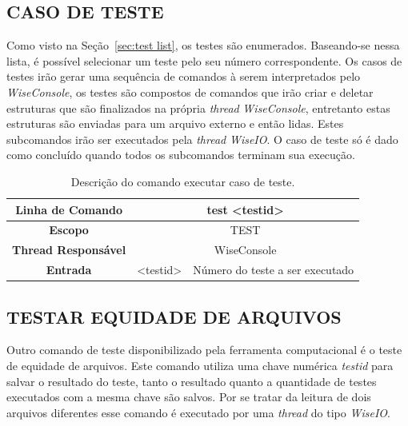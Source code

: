 \subsection{CASO DE TESTE}\label{sec:case list}

Como visto na Seção~\ref{sec:test list}, os testes são enumerados. Baseando-se nessa lista, é possível selecionar um teste pelo seu número correspondente. Os casos de testes irão gerar uma sequência de comandos à serem interpretados pelo \textit{WiseConsole}, os testes são compostos de comandos que irão criar e deletar estruturas que são finalizados na própria \textit{thread} \textit{WiseConsole}, entretanto estas estruturas são enviadas para um arquivo externo e então lidas. Estes subcomandos irão ser executados pela \textit{thread} \textit{WiseIO}. O caso de teste só é dado como concluído quando todos os subcomandos terminam sua execução.

\begin{center}
	\begin{table}[!htbp]
		\begin{tabularx}{\textwidth}{c|c|X}
			\toprule
			\textbf{Linha de Comando} & \multicolumn{2}{c}{test <test\underline{\space}id>} \\
			\midrule
			\textbf{Escopo} & \multicolumn{2}{c}{TEST} \\
			\hline
			\textbf{Thread Responsável} & \multicolumn{2}{c}{WiseConsole} \\
			\hline
			\textbf{Entrada} & <test\underline{\space}id> & Número do teste a ser executado \\
			\bottomrule
		\end{tabularx}
		\caption{Descrição do comando executar caso de teste.}
		\label{tab:case_test}
	\end{table}
\end{center}

\subsection{TESTAR EQUIDADE DE ARQUIVOS}\label{sec:test_file}

Outro comando de teste disponibilizado pela ferramenta computacional é o teste de equidade de arquivos. Este comando utiliza uma chave numérica \textit{test\underline{\space}id} para salvar o resultado do teste, tanto o resultado quanto a quantidade de testes executados com a mesma chave são salvos. Por se tratar da leitura de dois arquivos diferentes esse comando é executado por uma \textit{thread} do tipo \textit{WiseIO}.

